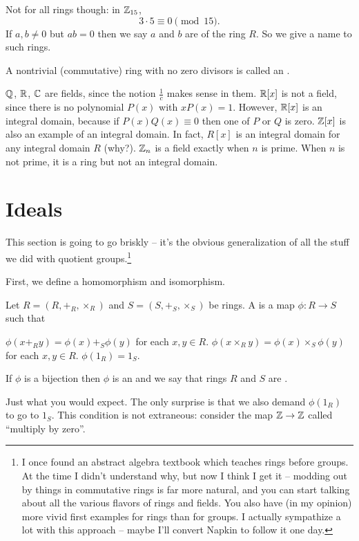 Not for all rings though: in $\mathbb Z_{15}$, 
\[ 3 \cdot 5 \equiv 0 \pmod{15}. \]
If $a, b \neq 0$ but $ab=0$ then we say $a$ and $b$ are 
of the ring $R$.
So we give a name to such rings.
\begin{definition}
	A nontrivial (commutative) ring with no zero divisors
	is called an .
\end{definition}

\begin{example}
	\listhack
	\begin{enumerate}[(a)]
		\ii $\mathbb Q$, $\mathbb R$, $\mathbb C$ are fields, since the notion $\frac 1c$ makes sense in them.
		\ii $\mathbb R[x]$ is not a field, since there is no polynomial $P(x)$ with $xP(x) = 1$.
		However, $\mathbb R[x]$ is an integral domain, because if $P(x) Q(x) \equiv 0$ then one
		of $P$ or $Q$ is zero.
		\ii $\mathbb Z[x]$ is also an example of an integral domain.
		In fact, $R[x]$ is an integral domain for any integral domain $R$ (why?).
		\ii $\mathbb Z_{n}$ is a field exactly when $n$ is prime.
		When $n$ is not prime, it is a ring but not an integral domain.
	\end{enumerate}
\end{example}

\section{Ideals}
This section is going to go briskly --
it's the obvious generalization of all the stuff we did with quotient groups.\footnote{%
	I once found an abstract algebra textbook which teaches rings
	before groups.  At the time I didn't understand why,
	but now I think I get it -- modding out by things in
	commutative rings is far more natural, and you can start talking
	about all the various flavors of rings and fields.
	You also have (in my opinion) more vivid first examples
	for rings than for groups.
	I actually sympathize a lot with this approach -- maybe I'll convert
	Napkin to follow it one day.}

First, we define a homomorphism and isomorphism.

\begin{definition}
	Let $R = (R, +_R, \times_R)$ and $S = (S, +_S, \times_S)$ be rings.
	A  is a map $\phi : R \to S$
	such that 
	\begin{enumerate}[(i)]
		\ii $\phi(x +_R y) = \phi(x) +_S \phi(y)$ for each $x,y \in R$.
		\ii $\phi(x \times_R y) = \phi(x) \times_S \phi(y)$ for each $x,y \in R$.
		\ii $\phi(1_R) = 1_S$.
	\end{enumerate}
	If $\phi$ is a bijection then $\phi$ is an 
	and we say that rings $R$ and $S$ are .
\end{definition}
Just what you would expect.
The only surprise is that we also demand $\phi(1_R)$ to go to $1_S$.
This condition is not extraneous:
consider the map $\mathbb Z \to \mathbb Z$ called ``multiply by zero''.

